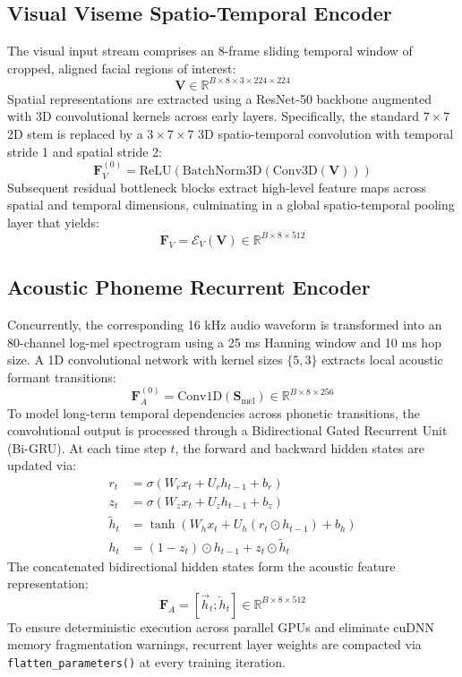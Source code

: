 \documentclass[journal]{IEEEtran}
\begin{document}
\subsection{Visual Viseme Spatio-Temporal Encoder}
The visual input stream comprises an 8-frame sliding temporal window of cropped, aligned facial regions of interest:
\begin{equation}
\mathbf{V} \in \mathbb{R}^{B \times 8 \times 3 \times 224 \times 224}
\end{equation}
Spatial representations are extracted using a ResNet-50 backbone augmented with 3D convolutional kernels across early layers. Specifically, the standard $7 \times 7$ 2D stem is replaced by a $3 \times 7 \times 7$ 3D spatio-temporal convolution with temporal stride 1 and spatial stride 2:
\begin{equation}
\mathbf{F}_V^{(0)} = \text{ReLU}\left( \text{BatchNorm3D}\left( \text{Conv3D}(\mathbf{V}) \right) \right)
\end{equation}
Subsequent residual bottleneck blocks extract high-level feature maps across spatial and temporal dimensions, culminating in a global spatio-temporal pooling layer that yields:
\begin{equation}
\mathbf{F}_V = \mathcal{E}_V(\mathbf{V}) \in \mathbb{R}^{B \times 8 \times 512}
\end{equation}

\subsection{Acoustic Phoneme Recurrent Encoder}
Concurrently, the corresponding 16 kHz audio waveform is transformed into an 80-channel log-mel spectrogram using a 25 ms Hanning window and 10 ms hop size. A 1D convolutional network with kernel sizes $\{5, 3\}$ extracts local acoustic formant transitions:
\begin{equation}
\mathbf{F}_A^{(0)} = \text{Conv1D}(\mathbf{S}_{\text{mel}}) \in \mathbb{R}^{B \times 8 \times 256}
\end{equation}
To model long-term temporal dependencies across phonetic transitions, the convolutional output is processed through a Bidirectional Gated Recurrent Unit (Bi-GRU). At each time step $t$, the forward and backward hidden states are updated via:
\begin{align}
r_t &= \sigma\left( W_r x_t + U_r h_{t-1} + b_r \right) \\
z_t &= \sigma\left( W_z x_t + U_z h_{t-1} + b_z \right) \\
\tilde{h}_t &= \tanh\left( W_h x_t + U_h (r_t \odot h_{t-1}) + b_h \right) \\
h_t &= (1 - z_t) \odot h_{t-1} + z_t \odot \tilde{h}_t
\end{align}
The concatenated bidirectional hidden states form the acoustic feature representation:
\begin{equation}
\mathbf{F}_A = [\vec{h}_t; \overleftarrow{h}_t] \in \mathbb{R}^{B \times 8 \times 512}
\end{equation}
To ensure deterministic execution across parallel GPUs and eliminate cuDNN memory fragmentation warnings, recurrent layer weights are compacted via \texttt{flatten\_parameters()} at every training iteration.
\end{document}
